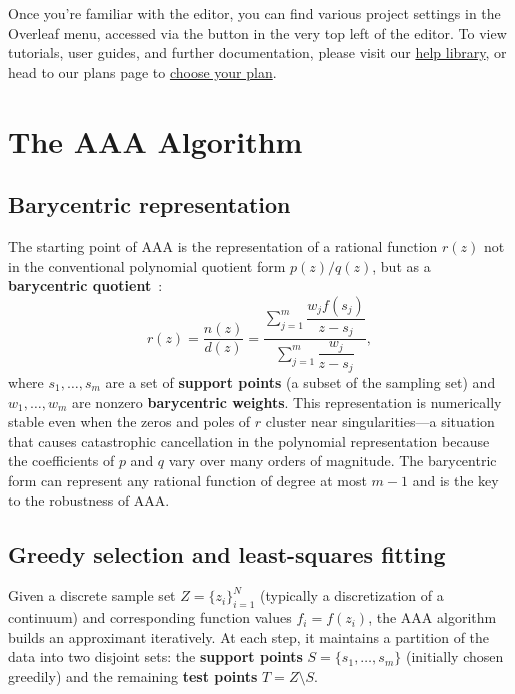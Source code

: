 \documentclass{article}
\begin{document}
Once you're familiar with the editor, you can find various project settings in the Overleaf menu, accessed via the button in the very top left of the editor. To view tutorials, user guides, and further documentation, please visit our \href{https://www.overleaf.com/learn}{help library}, or head to our plans page to \href{https://www.overleaf.com/user/subscription/plans}{choose your plan}.

\section{The AAA Algorithm}

\subsection{Barycentric representation}

The starting point of AAA is the representation of a rational function \(r(z)\) not in the conventional polynomial quotient form \(p(z)/q(z)\), but as a \textbf{barycentric quotient}~\cite{Berrut2004}:
\[
r(z) = \frac{n(z)}{d(z)} = \frac{\sum_{j=1}^{m} \dfrac{w_j f(s_j)}{z - s_j}}{\sum_{j=1}^{m} \dfrac{w_j}{z - s_j}},
\tag{1}
\]
where \(s_1,\dots,s_m\) are a set of \textbf{support points} (a subset of the sampling set) and \(w_1,\dots,w_m\) are nonzero \textbf{barycentric weights}. This representation is numerically stable even when the zeros and poles of \(r\) cluster near singularities—a situation that causes catastrophic cancellation in the polynomial representation because the coefficients of \(p\) and \(q\) vary over many orders of magnitude. The barycentric form can represent any rational function of degree at most \(m-1\) and is the key to the robustness of AAA.

\subsection{Greedy selection and least-squares fitting}

Given a discrete sample set \(Z = \{z_i\}_{i=1}^{N}\) (typically a discretization of a continuum) and corresponding function values \(f_i = f(z_i)\), the AAA algorithm builds an approximant iteratively. At each step, it maintains a partition of the data into two disjoint sets: the \textbf{support points} \(S = \{s_1,\dots,s_m\}\) (initially chosen greedily) and the remaining \textbf{test points} \(T = Z \setminus S\).
\end{document}
